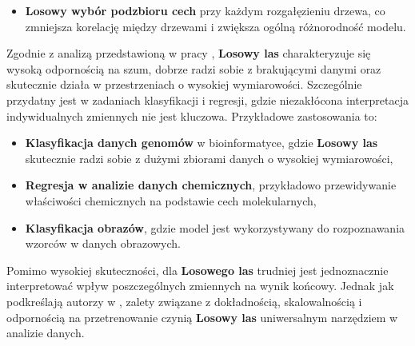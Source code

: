 \begin{itemize}
	\item
	      \textbf{Losowy wybór podzbioru cech} przy każdym rozgałęzieniu drzewa, co zmniejsza korelację między drzewami i zwiększa ogólną różnorodność modelu.
\end{itemize}

Zgodnie z analizą przedstawioną w pracy \cite{Random_forest}, \textbf{Losowy las} charakteryzuje się wysoką odpornością na szum, dobrze radzi sobie z brakującymi danymi oraz skutecznie działa w przestrzeniach o wysokiej wymiarowości. Szczególnie przydatny jest w zadaniach klasyfikacji i regresji, gdzie niezakłócona interpretacja indywidualnych zmiennych nie jest kluczowa. Przykładowe zastosowania to:

\begin{itemize}
	\item
	      \textbf{Klasyfikacja danych genomów} w bioinformatyce, gdzie \textbf{Losowy las} skutecznie radzi sobie z dużymi zbiorami danych o wysokiej wymiarowości,
	\item
	      \textbf{Regresja w analizie danych chemicznych}, przykładowo przewidywanie właściwości chemicznych na podstawie cech molekularnych,
	\item
	      \textbf{Klasyfikacja obrazów}, gdzie model jest wykorzystywany do rozpoznawania wzorców w danych obrazowych.
\end{itemize}

Pomimo wysokiej skuteczności, dla \textbf{Losowego las} trudniej jest jednoznacznie interpretować wpływ poszczególnych zmiennych na wynik końcowy. Jednak jak podkreślają autorzy w \cite{Random_forest}, zalety związane z dokładnością, skalowalnością i odpornością na przetrenowanie czynią \textbf{Losowy las} uniwersalnym narzędziem w analizie danych.

